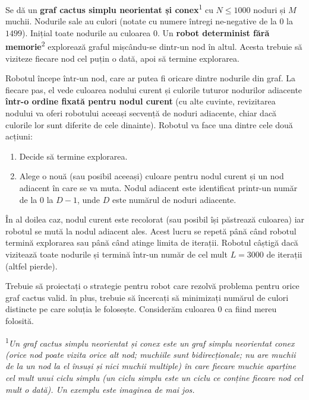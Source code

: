 \documentclass[12pt]{article}
\begin{document}
\renewcommand{\round}{Day 2}
\renewcommand{\problemName}{Task Navigation}
\renewcommand{\lang}{Romanian}

\renewcommand{\tl}{$3$ sec.}
\renewcommand{\ml}{$512$ MB}
\problem{\problemName}

Se dă un \textbf{graf cactus simplu neorientat și conex}\textsuperscript{1} cu $N \leq 1000$ noduri și $M$ muchii. Nodurile sale au culori (notate cu numere întregi ne-negative de la $0$ la $1499$). Inițial toate nodurile au culoarea $0$. Un \textbf{robot determinist fără memorie}\textsuperscript{2} explorează graful mișcându-se dintr-un nod în altul. Acesta trebuie să viziteze fiecare nod cel puțin o dată, apoi să termine explorarea.

Robotul începe într-un nod, care ar putea fi oricare dintre nodurile din graf. La fiecare pas, el vede culoarea nodului curent și culorile tuturor nodurilor adiacente \textbf{într-o ordine fixată pentru nodul curent} (cu alte cuvinte, revizitarea nodului va oferi robotului aceeași secvență de noduri adiacente, chiar dacă culorile lor sunt diferite de cele dinainte). Robotul va face una dintre cele două acțiuni:
\begin{enumerate}
    \item Decide să termine explorarea.
    \item Alege o nouă (sau posibil aceeași) culoare pentru nodul curent și un nod adiacent în care se va muta. Nodul adiacent este identificat printr-un număr de la $0$ la $D-1$, unde $D$ este numărul de noduri adiacente.
\end{enumerate}

În al doilea caz, nodul curent este recolorat (sau posibil își păstrează culoarea) iar robotul se mută la nodul adiacent ales. Acest lucru se repetă până când robotul termină explorarea sau până când atinge limita de iterații. Robotul câștigă dacă vizitează toate nodurile și termină într-un număr de cel mult $L=3000$ de iterații (altfel pierde).

Trebuie să proiectați o strategie pentru robot care rezolvă problema pentru orice graf cactus valid. în plus, trebuie să încercați să minimizați numărul de culori distincte pe care soluția le folosește. Considerăm culoarea $0$ ca fiind mereu folosită.

\textsuperscript{1}\textit{Un graf cactus simplu neorientat și conex este un graf simplu neorientat conex (orice nod poate vizita orice alt nod; muchiile sunt bidirecționale; nu are muchii de la un nod la el însuși și nici muchii multiple) în care fiecare muchie aparține cel mult unui ciclu simplu (un ciclu simplu este un ciclu ce conține fiecare nod cel mult o dată). Un exemplu este imaginea de mai jos.}
\end{document}
